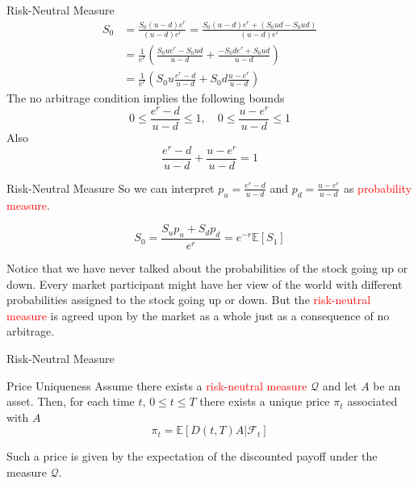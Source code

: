 \documentclass{beamer}
\begin{document}
\begin{frame}{Risk-Neutral Measure}
\begin{equation*}
	\begin{aligned}
	S_0 &= \frac{S_0(u-d)e^r}{(u-d)e^r} = \frac{S_0(u-d)e^r + (S_0ud - S_0ud)}{(u-d)e^r}\\
	&= \frac{1}{e^r}\left(\frac{S_0ue^r - S_0ud}{u-d} + \frac{-S_0de^r + S_0ud}{u-d}\right) \\
	&= \frac{1}{e^r}\left(S_0u\frac{e^r - d}{u-d} + S_0d\frac{u - e^r}{u-d}\right)
	\end{aligned}
\end{equation*}
The no arbitrage condition implies the following bounds
\begin{equation*}
0\le\frac{e^r -d}{u-d}\le 1,\quad 0\le\frac{u - e^r}{u-d}\le 1
\end{equation*}
Also
\begin{equation*}
 \frac{e^r -d}{u-d} + \frac{u - e^r}{u-d} = 1
\end{equation*}
\end{frame}

\begin{frame}{Risk-Neutral Measure}
So we can interpret $p_u=\frac{e^r -d}{u-d}$ and $p_d=\frac{u - e^r}{u-d}$ as \textcolor{red}{probability measure}.

\begin{equation*}
S_0 = \frac{S_up_u + S_dp_d}{e^r} = e^{-r}\mathbb{E}[S_1]
\end{equation*}

Notice that we have never talked about the probabilities of the stock going up or down. Every market participant might have her view of the world with different probabilities assigned to the stock going up or down. But the \textcolor{red}{risk-neutral measure} is agreed upon by the market as a whole just as a consequence of no arbitrage.
\end{frame}

\begin{frame}{Risk-Neutral Measure}
	\begin{block}{Price Uniqueness}
	Assume there exists a \textcolor{red}{risk-neutral measure} $\mathcal{Q}$ %
	and let $A$ be an asset. Then, for each time $t$, $0\le t\le T$ there exists a unique price $\pi_t$ associated with $A$
	\begin{equation}
		\pi_t = \mathbb{E}[D(t,T)A|\mathcal{F}_t]
		\label{eq:risk_neutral_pricing}
	\end{equation}
\end{block}
Such a price is given by the expectation of the discounted payoff under the measure $\mathcal{Q}$.
\end{frame}
\end{document}
